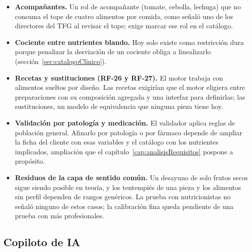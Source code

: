 \begin{itemize}
    \item \textbf{Acompañantes.} Un rol de acompañante (tomate, cebolla, lechuga) que no consuma el tope de cuatro alimentos por comida, como señaló uno de los directores del TFG al revisar el tope; exige marcar ese rol en el catálogo.
    \item \textbf{Cociente entre nutrientes blando.} Hoy solo existe como restricción dura porque penalizar la desviación de un cociente obliga a linealizarlo (sección~\ref{sec:catalogoClinico}).
    \item \textbf{Recetas y sustituciones (RF-26 y RF-27).} El motor trabaja con alimentos sueltos por diseño. Las recetas exigirían que el motor eligiera entre preparaciones con su composición agregada y una interfaz para definirlas; las sustituciones, un modelo de equivalencia que ninguna pieza tiene hoy.
    \item \textbf{Validación por patología y medicación.} El validador aplica reglas de población general. Afinarlo por patología o por fármaco depende de ampliar la ficha del cliente con esas variables y el catálogo con los nutrientes implicados, ampliación que el capítulo~\ref{cap:analisisRequisitos} pospone a propósito.
    \item \textbf{Residuos de la capa de sentido común.} Un desayuno de solo frutos secos sigue siendo posible en teoría, y los tentempiés de una pieza y los alimentos sin perfil dependen de rangos genéricos. La prueba con nutricionistas no señaló ninguno de estos casos; la calibración fina queda pendiente de una prueba con más profesionales.
\end{itemize}

\subsection{Copiloto de IA}
\label{sec:futuroCopiloto}

